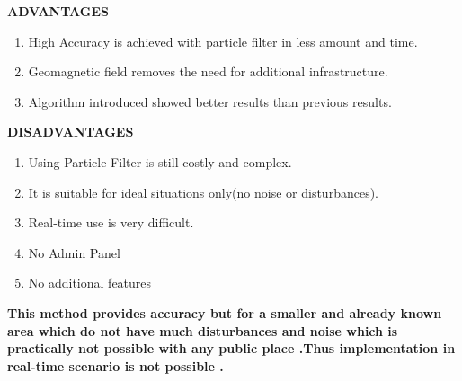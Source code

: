 \documentclass[a4paper, 12pt]{article}
\begin{document}
\textbf{ADVANTAGES}
\begin{enumerate}
	\item	High Accuracy is achieved with particle filter in less amount and time.
	\item	Geomagnetic field removes the need for additional infrastructure.
	\item	Algorithm introduced showed better results than previous results.
	
\end{enumerate}
\textbf{DISADVANTAGES}
\begin{enumerate}
	\item	Using Particle Filter is still costly and complex.
	\item	It is suitable for ideal situations only(no noise or disturbances).
	\item	Real-time use is very difficult.
	\item	No Admin Panel
	\item	No additional features		
\end{enumerate}
\textbf{This method provides accuracy but for a smaller and already known area which do not have much disturbances and noise which is practically not possible with any public place .Thus implementation in real-time scenario is not possible .}
\newpage

\begin{center}
\end{center}
\end{document}
